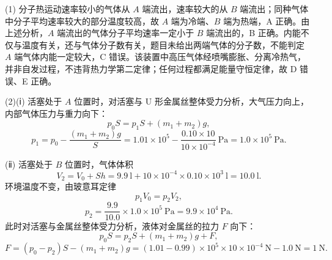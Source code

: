 \begin{answer}
(1) 分子热运动速率较小的气体从 $A$ 端流出，速率较大的从 $B$ 端流出；同种气体中分子平均速率较大的部分温度较高，故 $A$ 端为冷端、$B$ 端为热端，A 正确。由上述分析，$A$ 端流出的气体分子平均速率一定小于 $B$ 端流出的，B 正确。内能不仅与温度有关，还与气体分子数有关，题目未给出两端气体的分子数，不能判定 $A$ 端气体内能一定较大，C 错误。该装置中高压气体经喷嘴膨胀、分离冷热气，并非自发过程，不违背热力学第二定律；任何过程都满足能量守恒定律，故 D 错误、E 正确。

(2)(ⅰ) 活塞处于 $A$ 位置时，对活塞与 U 形金属丝整体受力分析，大气压力向上，内部气体压力与重力向下：
\[
  p_{0}S=p_{1}S+(m_{1}+m_{2})g,
\]
\[
  p_{1}=p_{0}-\frac{(m_{1}+m_{2})g}{S}
  =1.01\times10^{5}-\frac{0.10\times10}{10\times10^{-4}}~\si{\pascal}
  =1.0\times10^{5}~\si{\pascal}.
\]

(ⅱ) 活塞处于 $B$ 位置时，气体体积
\[
  V_{2}=V_{0}+Sh=9.9~\si{\litre}+10\times10^{-4}\times0.10\times10^{3}~\si{\litre}
  =10.0~\si{\litre}.
\]
环境温度不变，由玻意耳定律
\[
  p_{1}V_{0}=p_{2}V_{2},
\]
\[
  p_{2}=\frac{9.9}{10.0}\times1.0\times10^{5}~\si{\pascal}
  =9.9\times10^{4}~\si{\pascal}.
\]
此时对活塞与金属丝整体受力分析，液体对金属丝的拉力 $F$ 向下：
\[
  p_{0}S=p_{2}S+(m_{1}+m_{2})g+F,
\]
\[
  F=(p_{0}-p_{2})S-(m_{1}+m_{2})g
  =(1.01-0.99)\times10^{5}\times10\times10^{-4}~\si{\newton}-1.0~\si{\newton}
  =1~\si{\newton}.
\]
\end{answer}

